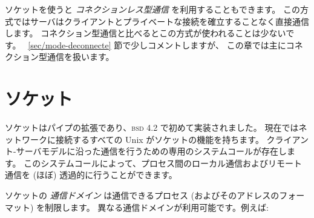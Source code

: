 ソケットを使うと \emph{コネクションレス型通信} を利用することもできます。
この方式ではサーバはクライアントとプライベートな接続を確立することなく直接通信します。
コネクション型通信と比べるとこの方式が使われることは少ないです。
~\ref{sec/mode-deconnecte} 節で少しコメントしますが、
この章では主にコネクション型通信を扱います。

\section{ソケット}

ソケットはパイプの拡張であり、\textsc{bsd} 4.2 で初めて実装されました。
現在ではネットワークに接続するすべての Unix がソケットの機能を持ちます。
クライアント-サーバモデルに沿った通信を行うための専用のシステムコールが存在します。
このシステムコールによって、プロセス間のローカル通信およびリモート通信を (ほぼ) 透過的に行うことができます。

ソケットの \emph{通信ドメイン} は通信できるプロセス (およびそのアドレスのフォーマット) を制限します。
異なる通信ドメインが利用可能です。例えば:

